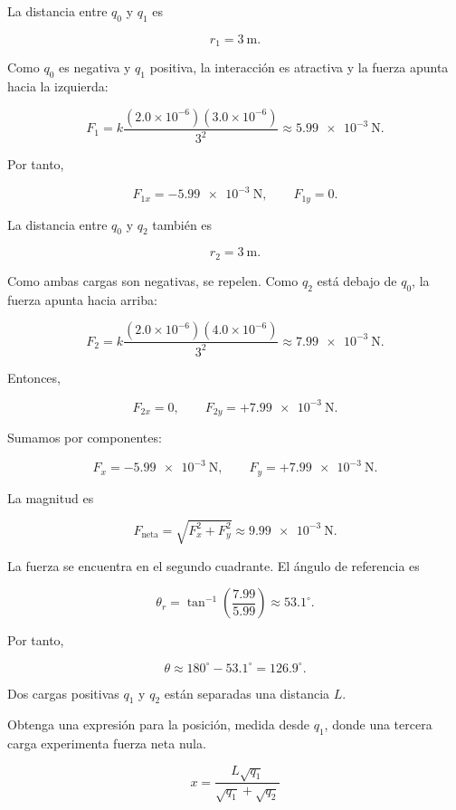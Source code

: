 \begin{explicacion}
La distancia entre \(q_0\) y \(q_1\) es

\[
r_1=\SI{3}{\metre}.
\]

Como \(q_0\) es negativa y \(q_1\) positiva, la interacción es atractiva y
la fuerza apunta hacia la izquierda:

\[
F_1=k\frac{(2.0\times10^{-6})(3.0\times10^{-6})}{3^2}
\approx\SI{5.99e-3}{\newton}.
\]

Por tanto,

\[
F_{1x}=-\SI{5.99e-3}{\newton}, \qquad F_{1y}=0.
\]

La distancia entre \(q_0\) y \(q_2\) también es

\[
r_2=\SI{3}{\metre}.
\]

Como ambas cargas son negativas, se repelen. Como \(q_2\) está debajo de
\(q_0\), la fuerza apunta hacia arriba:

\[
F_2=k\frac{(2.0\times10^{-6})(4.0\times10^{-6})}{3^2}
\approx\SI{7.99e-3}{\newton}.
\]

Entonces,

\[
F_{2x}=0, \qquad F_{2y}=+\SI{7.99e-3}{\newton}.
\]

Sumamos por componentes:

\[
F_x=-\SI{5.99e-3}{\newton},
\qquad
F_y=+\SI{7.99e-3}{\newton}.
\]

La magnitud es

\[
F_{\text{neta}}
=
\sqrt{F_x^2+F_y^2}
\approx\SI{9.99e-3}{\newton}.
\]

La fuerza se encuentra en el segundo cuadrante. El ángulo de referencia es

\[
\theta_r=\tan^{-1}\left(\frac{7.99}{5.99}\right)\approx53.1^\circ.
\]

Por tanto,

\[
\boxed{\theta\approx180^\circ-53.1^\circ=126.9^\circ}.
\]
\end{explicacion}


\begin{ejercicio}
Dos cargas positivas \(q_1\) y \(q_2\) están separadas una distancia \(L\).

Obtenga una expresión para la posición, medida desde \(q_1\), donde una
tercera carga experimenta fuerza neta nula.
\end{ejercicio}

\begin{respuesta}
\[
\boxed{x=\frac{L\sqrt{q_1}}{\sqrt{q_1}+\sqrt{q_2}}}
\]
\end{respuesta}

